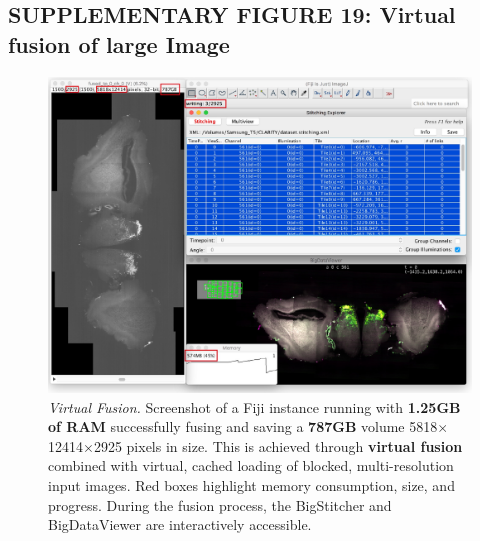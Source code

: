 \documentclass[]{spie}  %
\begin{document}
\subsection*{SUPPLEMENTARY FIGURE 19: Virtual fusion of large Image}
\vspace{1mm}
\begin{figure}[h!]
\includegraphics[width=\textwidth]{fig-fusion-screenshot.jpg}
\vspace{-2.0mm}
\caption{\hspace{-0.5mm} \emph{Virtual Fusion.} Screenshot of a Fiji instance running with \textbf{1.25GB of RAM} successfully fusing and saving a \textbf{787GB} volume 5818$\times$12414$\times$2925 pixels in size. This is achieved through \textbf{virtual fusion} combined with virtual, cached loading of blocked, multi-resolution input images. Red boxes highlight memory consumption, size, and progress. During the fusion process, the BigStitcher and BigDataViewer are interactively accessible.
}
\label{fig:sup-fig-fusion}
\end{figure}

\pagebreak
\end{document}
